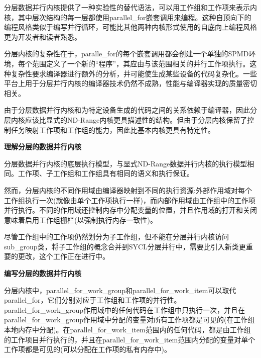 分层数据并行内核提供了一种实验性的替代语法，可以用工作组和工作项来表示内核，其中层次结构的每一层都使用parallel\_for嵌套调用来编程。这种自顶向下的编程风格类似于编写并行循环，可能比其他两种内核形式使用的自底向上编程风格更为开发者和读者熟悉。\par

分层内核的复杂性在于，paralle\_for的每个嵌套调用都会创建一个单独的SPMD环境，每个范围定义了一个新的“程序”，其应由与该范围相关的并行工作项执行。这种复杂性要求编译器进行额外的分析，并可能使生成某些设备的代码复杂化。一些平台上用于分层并行内核的编译器技术仍然不成熟，性能与编译器实现的质量密切相关。\par

由于分层数据并行内核和为特定设备生成的代码之间的关系依赖于编译器，因此分层内核应该比显式的ND-Range内核更具描述性的结构。但由于分层内核保留了控制任务映射工作项和工作组的能力，因此比基本内核更具有特定性。\par

\hspace*{\fill} \par %
\textbf{理解分层的数据并行内核}

分层数据并行内核的底层执行模型，与显式ND-Range数据并行内核的执行模型相同。工作项、子工作组和工作组具有相同的语义和执行保证。\par

然而，分层内核的不同作用域由编译器映射到不同的执行资源:外部作用域对每个工作组执行一次(就像由单个工作项执行一样)，而内部作用域由工作组中的工作项并行执行。不同的作用域还控制内存中分配变量的位置，并且作用域的打开和关闭意味着启用工作组栅栏(以强制执行内存一致性)。\par

尽管工作组中的工作项仍然划分为子工作组，但不能在分层并行内核访问sub\_group类，将子工作组的概念合并到SYCL分层并行中，需要比引入新类更重要的更改，这个工作正在进行中。\par

\hspace*{\fill} \par %
\textbf{编写分层的数据并行内核}

分层内核中，parallel\_for\_work\_group和parallel\_for\_work\_item可以取代parallel\_for，它们分别对应于工作组和工作项的并行性。parallel\_for\_work\_group作用域中的任何代码在工作组中只执行一次，并且在parallel\_for\_work\_group作用域中分配的变量对所有工作项都是可见的(在工作组本地内存中分配)。在parallel\_for\_work\_item范围内的任何代码，都是由工作组的工作项目并行执行的，并且在parallel\_for\_work\_item范围内分配的变量对单个工作项都是可见的(可以分配在工作项的私有内存中)。\par

